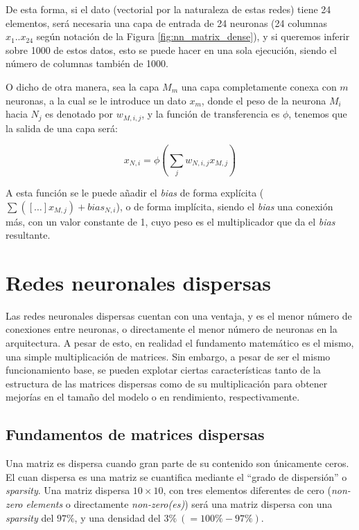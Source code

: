 De esta forma, si el dato (vectorial por la naturaleza de estas redes) tiene 24 elementos, será necesaria una capa de entrada de 24 neuronas (24 columnas $x_{1} .. x_{24}$ según notación de la Figura \ref{fig:nn_matrix_dense}), y si queremos inferir sobre 1000 de estos datos, esto se puede hacer en una sola ejecución, siendo el número de columnas también de 1000.

O dicho de otra manera, sea la capa $M_{m}$ una capa completamente conexa con $m$ neuronas, a la cual se le introduce un dato $x_{m}$, donde el peso de la neurona $M_{i}$ hacia $N_{j}$ es denotado por $w_{M,i,j}$, y la función de transferencia es $\phi$, tenemos que la salida de una capa será:

\begin{equation}
    x_{N,i} = \phi\left(\sum_{j}w_{N,i,j}x_{M,j}\right)
    \label{eq:dense_nn_eq}
\end{equation}

A esta función se le puede añadir el \textit{bias} de forma explícita ($\sum\left([\dots] x_{M,j}\right) + bias_{N,i}$), o de forma implícita, siendo el \textit{bias} una conexión más, con un valor constante de 1, cuyo peso es el multiplicador que da el \textit{bias} resultante.

\section{Redes neuronales dispersas}
\label{sec:redes_reuronales_dispersas}
Las redes neuronales dispersas cuentan con una ventaja, y es el menor número de conexiones entre neuronas, o directamente el menor número de neuronas en la arquitectura. A pesar de esto, en realidad el fundamento matemático es el mismo, una simple multiplicación de matrices. Sin embargo, a pesar de ser el mismo funcionamiento base, se pueden explotar ciertas características tanto de la estructura de las matrices dispersas como de su multiplicación para obtener mejorías en el tamaño del modelo o en rendimiento, respectivamente.

\subsection{Fundamentos de matrices dispersas}
\label{ssec:fundamentos_matrices_dispersas}
Una matriz es dispersa cuando gran parte de su contenido son únicamente ceros. El cuan dispersa es una matriz se cuantifica mediante el ``grado de dispersión'' o \textit{sparsity}. Una matriz dispersa $10 \times 10$, con tres elementos diferentes de cero (\textit{non-zero elements} o directamente \textit{non-zero(es)}) será una matriz dispersa con una \textit{sparsity} del $97\%$, y una densidad del $3\% \:(=100\%-97\%)$.

